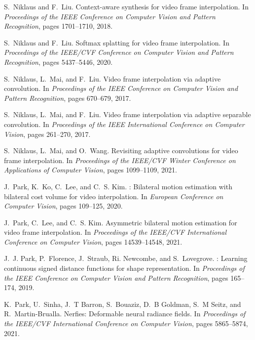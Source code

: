 \documentclass[12pt]{article}
\begin{document}
\begin{thebibliography}{10}
S.~Niklaus and F.~Liu.
\newblock Context-aware synthesis for video frame interpolation.
\newblock In {\em Proceedings of the IEEE Conference on Computer Vision and
  Pattern Recognition}, pages 1701--1710, 2018.

S.~Niklaus and F.~Liu.
\newblock Softmax splatting for video frame interpolation.
\newblock In {\em Proceedings of the IEEE/CVF Conference on Computer Vision and
  Pattern Recognition}, pages 5437--5446, 2020.

S.~Niklaus, L.~Mai, and F.~Liu.
\newblock Video frame interpolation via adaptive convolution.
\newblock In {\em Proceedings of the IEEE Conference on Computer Vision and
  Pattern Recognition}, pages 670--679, 2017.

S.~Niklaus, L.~Mai, and F.~Liu.
\newblock Video frame interpolation via adaptive separable convolution.
\newblock In {\em Proceedings of the IEEE International Conference on Computer
  Vision}, pages 261--270, 2017.

S.~Niklaus, L.~Mai, and O.~Wang.
\newblock Revisiting adaptive convolutions for video frame interpolation.
\newblock In {\em Proceedings of the IEEE/CVF Winter Conference on Applications
  of Computer Vision}, pages 1099--1109, 2021.

J.~Park, K.~Ko, C.~Lee, and C.~S. Kim.
: Bilateral motion estimation with bilateral cost volume for
  video interpolation.
\newblock In {\em European Conference on Computer Vision}, pages 109--125,
  2020.

J.~Park, C.~Lee, and C.~S. Kim.
\newblock Asymmetric bilateral motion estimation for video frame interpolation.
\newblock In {\em Proceedings of the IEEE/CVF International Conference on
  Computer Vision}, pages 14539--14548, 2021.

J.~J. Park, P.~Florence, J.~Straub, Ri. Newcombe, and S.~Lovegrove.
: Learning continuous signed distance functions for shape
  representation.
\newblock In {\em Proceedings of the IEEE Conference on Computer Vision and
  Pattern Recognition}, pages 165--174, 2019.

K.~Park, U.~Sinha, J.~T Barron, S.~Bouaziz, D.~B Goldman, S.~M Seitz, and
  R.~Martin-Brualla.
\newblock Nerfies: Deformable neural radiance fields.
\newblock In {\em Proceedings of the IEEE/CVF International Conference on
  Computer Vision}, pages 5865--5874, 2021.


\end{thebibliography}
\end{document}
